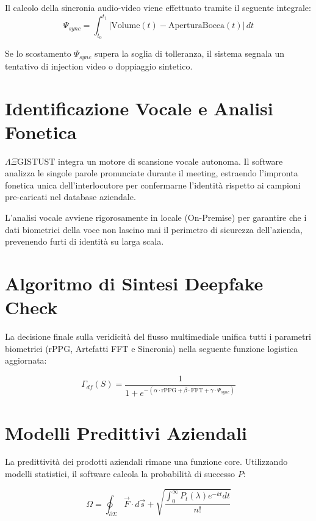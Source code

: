 \documentclass[12pt,a4paper,oneside]{book}
\newcommand{\aegistrust}{$\Lambda\Xi$GIST\reflectbox{R}UST}
\newcommand{\pred}[1]{P_{#1}(\lambda)}
\newcommand{\deepcheck}[1]{\Gamma_{df}(#1)}
\newenvironment{industrialNote}
{\begin{tcolorbox}[colback=blue!5,colframe=blue!75!black,title=Specifiche Industriali]}
{\end{tcolorbox}}
\begin{document}
Il calcolo della sincronia audio-video viene effettuato tramite il seguente integrale:
\begin{equation}
    \Psi_{sync} = \int_{t_0}^{t_1} | \text{Volume}(t) - \text{AperturaBocca}(t) | \, dt
\end{equation}

Se lo scostamento $\Psi_{sync}$ supera la soglia di tolleranza, il sistema segnala un tentativo di injection video o doppiaggio sintetico.

\section{Identificazione Vocale e Analisi Fonetica}
\aegistrust{} integra un motore di scansione vocale autonoma. Il software analizza le singole parole pronunciate durante il meeting, estraendo l'impronta fonetica unica dell'interlocutore per confermarne l'identità rispetto ai campioni pre-caricati nel database aziendale.

\begin{industrialNote}
L'analisi vocale avviene rigorosamente in locale (On-Premise) per garantire che i dati biometrici della voce non lascino mai il perimetro di sicurezza dell'azienda, prevenendo furti di identità su larga scala.
\end{industrialNote}

\section{Algoritmo di Sintesi Deepfake Check}
La decisione finale sulla veridicità del flusso multimediale unifica tutti i parametri biometrici (rPPG, Artefatti FFT e Sincronia) nella seguente funzione logistica aggiornata:

\begin{equation}
    \deepcheck{S} = \frac{1}{1 + e^{-(\alpha \cdot \text{rPPG} + \beta \cdot \text{FFT} + \gamma \cdot \Psi_{sync})}}
\end{equation}

\section{Modelli Predittivi Aziendali}
La predittività dei prodotti aziendali rimane una funzione core. Utilizzando modelli statistici, il software calcola la probabilità di successo $P$:

\begin{equation}
    \Omega= \oint_{\partial \Sigma} \vec{F} \cdot d\vec{s} + \sqrt{\frac{\int_{0}^{\infty} \pred{t} e^{-kt} dt}{n!}}
\end{equation}
\end{document}
